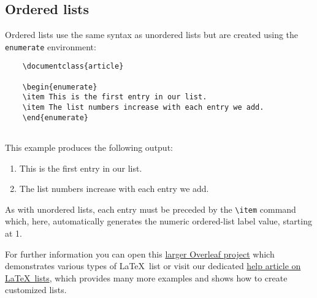 \subsection{Ordered lists}

Ordered lists use the same syntax as unordered lists but are created using the \verb|enumerate| environment:

\begin{tcolorbox}
\begin{verbatim}
    \documentclass{article}
    
    \begin{enumerate}
    \item This is the first entry in our list.
    \item The list numbers increase with each entry we add.
    \end{enumerate}
    
\end{verbatim}
\end{tcolorbox}

This example produces the following output:

\begin{mdframed}
    \begin{enumerate}
        \item This is the first entry in our list.
        \item The list numbers increase with each entry we add.
    \end{enumerate}
\end{mdframed}

As with unordered lists, each entry must be preceded by the \verb|\item| command which, here, automatically generates the numeric ordered-list label value, starting at 1.

For further information you can open this \href{https://www.overleaf.com/project/new/template/25521?id=107987258&templateName=Demonstrating+various+types+of+LaTeX+list&latexEngine=pdflatex&texImage=texlive-full%3A2022.1&mainFile=}{larger Overleaf project} which demonstrates various types of \LaTeX\ list or visit our dedicated \href{https://www.overleaf.com/learn/latex/Lists}{help article on \LaTeX\ lists}, which provides many more examples and shows how to create customized lists.
